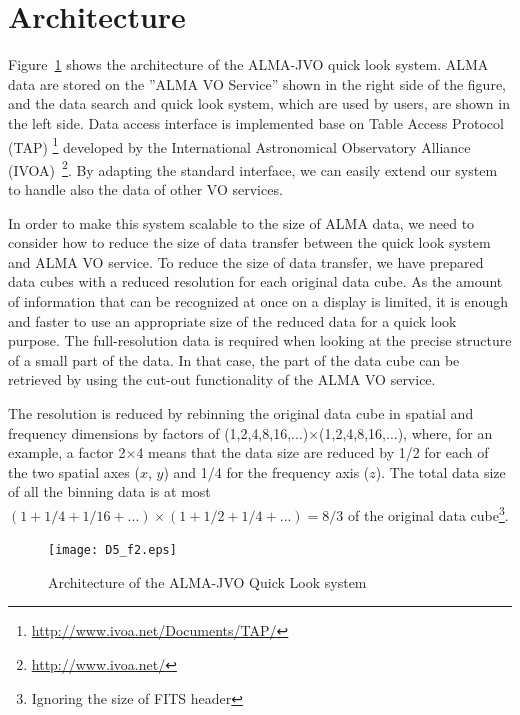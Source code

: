\documentclass[11pt,twoside]{article}
\begin{document}
\section{Architecture}

Figure~\ref{fig:2} shows the architecture of the ALMA-JVO quick look system.
ALMA data are stored on the ''ALMA VO Service'' shown in the right side of 
the figure, and the data search and quick look system, which are used by 
users, are shown in the left side.
Data access interface is implemented base on Table Access Protocol (TAP)
\footnote{\url{http://www.ivoa.net/Documents/TAP/}}
developed by the International Astronomical Observatory Alliance 
(IVOA)~\footnote{\url{http://www.ivoa.net/}}.
By adapting the standard interface, we can easily extend our system to
handle also the data of other VO services.

In order to make this system scalable to the size of ALMA data, we need to
consider how to reduce the size of data transfer between the quick look system
and ALMA VO service.
To reduce the size of data transfer, we have prepared data cubes with a reduced
resolution for each original data cube.
As the amount of information that can be recognized at once on a display 
is limited, it is enough and faster to use an appropriate size of the 
reduced data for a quick look purpose.
The full-resolution data is required when looking at the precise structure
of a small part of the data.
In that case, the part of the data cube can be retrieved by using the
cut-out functionality of the ALMA VO service.

The resolution is reduced by rebinning the original data cube in spatial and
frequency dimensions by factors of (1,2,4,8,16,...)$\times$(1,2,4,8,16,...),
where, for an example, a factor 2$\times$4 means that the data size are 
reduced by 1/2 for each of the two spatial axes ($x$, $y$) and 1/4 for the 
frequency axis ($z$).
The total data size of all the binning data is at most 
$(1 + 1/4 + 1/16 + ...) \times (1 + 1/2 + 1/4 + ...) = 8/3$  of the original data
cube\footnote{Ignoring the size of FITS header}.


\begin{figure}[t]
\begin{center}
\texttt{[image: D5\_f2.eps]}
\caption{Architecture of the ALMA-JVO Quick Look system}
\label{fig:2}
\end{center}
\end{figure}
\end{document}
